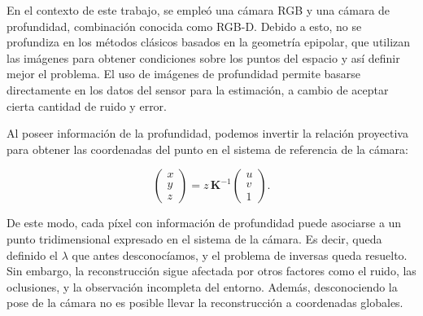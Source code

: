 En el contexto de este trabajo, se empleó una cámara RGB y una cámara de profundidad, combinación conocida como RGB-D. Debido a esto, no se profundiza en los métodos clásicos basados en la geometría epipolar, que utilizan las imágenes para obtener condiciones sobre los puntos del espacio y así definir mejor el problema. El uso de imágenes de profundidad permite basarse directamente en los datos del sensor para la estimación, a cambio de aceptar cierta cantidad de ruido y error.

Al poseer información de la profundidad, podemos invertir la relación proyectiva para obtener las coordenadas del punto en el sistema de referencia de la cámara:

\begin{equation}
\begin{pmatrix}
x \\
y \\
z
\end{pmatrix}
=
z \, \mathbf{K}^{-1}
\begin{pmatrix}
u \\
v \\
1
\end{pmatrix}.
\end{equation}

De este modo, cada píxel con información de profundidad puede asociarse a un punto
tridimensional expresado en el sistema de la cámara. Es decir, queda definido el $\lambda$ que antes desconocíamos, y el problema de inversas queda resuelto. Sin embargo, la reconstrucción sigue afectada por otros factores como el ruido, las oclusiones, y la observación incompleta del entorno. Además, desconociendo la pose de la cámara no es posible llevar la reconstrucción a coordenadas globales.